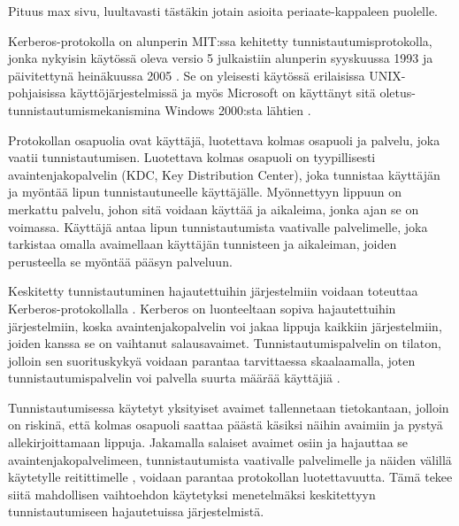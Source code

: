 Pituus max sivu, luultavasti tästäkin jotain asioita periaate-kappaleen puolelle.

Kerberos-protokolla on alunperin MIT:ssa kehitetty tunnistautumisprotokolla, jonka nykyisin käytössä oleva versio 5 julkaistiin alunperin syyskuussa 1993 ja päivitettynä heinäkuussa 2005 \cite{rfc4120}. Se on yleisesti käytössä erilaisissa UNIX-pohjaisissa käyttöjärjestelmissä ja myös Microsoft on käyttänyt sitä oletus-tunnistautumismekanismina Windows 2000:sta lähtien \cite{rfc3244}.

Protokollan osapuolia ovat käyttäjä, luotettava kolmas osapuoli ja palvelu, joka vaatii tunnistautumisen. Luotettava kolmas osapuoli on tyypillisesti avaintenjakopalvelin (KDC, Key Distribution Center), joka tunnistaa käyttäjän ja myöntää lipun tunnistautuneelle käyttäjälle. Myönnettyyn lippuun on merkattu palvelu, johon sitä voidaan käyttää ja aikaleima, jonka ajan se on voimassa. Käyttäjä antaa lipun tunnistautumista vaativalle palvelimelle, joka tarkistaa omalla avaimellaan käyttäjän tunnisteen ja aikaleiman, joiden perusteella se myöntää pääsyn palveluun.

Keskitetty tunnistautuminen hajautettuihin järjestelmiin voidaan toteuttaa Kerberos-protokollalla \cite{enchancing_distributed_web_security}. Kerberos on luonteeltaan sopiva hajautettuihin järjestelmiin, koska avaintenjakopalvelin voi jakaa lippuja kaikkiin järjestelmiin, joiden kanssa se on vaihtanut salausavaimet. Tunnistautumispalvelin on tilaton, jolloin sen suorituskykyä voidaan parantaa tarvittaessa skaalaamalla, joten tunnistautumispalvelin voi palvella suurta määrää käyttäjiä \cite{enchancing_distributed_web_security}.

Tunnistautumisessa käytetyt yksityiset avaimet tallennetaan tietokantaan, jolloin on riskinä, että kolmas osapuoli saattaa päästä käsiksi näihin avaimiin ja pystyä allekirjoittamaan lippuja. Jakamalla salaiset avaimet osiin ja hajauttaa se avaintenjakopalvelimeen, tunnistautumista vaativalle palvelimelle ja näiden välillä käytetylle reitittimelle \cite{secure_secret_key}, voidaan parantaa protokollan luotettavuutta. Tämä tekee siitä mahdollisen vaihtoehdon käytetyksi menetelmäksi keskitettyyn tunnistautumiseen hajautetuissa järjestelmistä.
